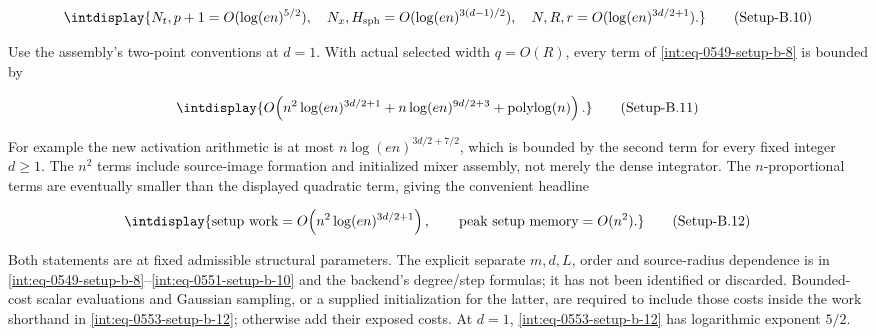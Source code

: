 \label{int:eq-setup-b-10}
\begingroup\renewcommand{\theHequation}{intdisplay.1043}
\begin{equation}
\intdisplay{
N_t,p+1=O(\log(en)^{5/2}),\quad
N_x,H_{\rm sph}=O(\log(en)^{3(d-1)/2}),\quad
N,R,r=O(\log(en)^{3d/2+1}).
}
\tag{Setup-B.10}
\label{int:eq-0551-setup-b-10}
\end{equation}
\endgroup


Use the assembly's two-point conventions at \(d=1\). With actual selected width \(q=O(R)\), every term of \hyperref[int:eq-setup-b-8]{\eqref{int:eq-0549-setup-b-8}} is bounded by


\label{int:eq-setup-b-11}
\begingroup\renewcommand{\theHequation}{intdisplay.1044}
\begin{equation}
\intdisplay{
O\!\left(n^2\log(en)^{3d/2+1}
             +n\log(en)^{9d/2+3}+\operatorname{polylog}(n)\right).
}
\tag{Setup-B.11}
\label{int:eq-0552-setup-b-11}
\end{equation}
\endgroup


For example the new activation arithmetic is at most \(n\log(en)^{3d/2+7/2}\), which is bounded by the second term for every fixed integer \(d\ge1\). The \(n^2\) terms include source-image formation and initialized mixer assembly, not merely the dense integrator. The \(n\)-proportional terms are eventually smaller than the displayed quadratic term, giving the convenient headline


\label{int:eq-setup-b-12}
\begingroup\renewcommand{\theHequation}{intdisplay.1045}
\begin{equation}
\intdisplay{
\text{setup work}=O\!\left(n^2\log(en)^{3d/2+1}\right),\qquad
\text{peak setup memory}=O(n^2).
}
\tag{Setup-B.12}
\label{int:eq-0553-setup-b-12}
\end{equation}
\endgroup


Both statements are at fixed admissible structural parameters. The explicit separate \(m,\allowbreak d,\allowbreak L\), order and source-radius dependence is in \hyperref[int:eq-setup-b-8]{\eqref{int:eq-0549-setup-b-8}}--\allowbreak \hyperref[int:eq-setup-b-10]{\eqref{int:eq-0551-setup-b-10}} and the backend's degree/step formulas; it has not been identified or discarded. Bounded-cost scalar evaluations and Gaussian sampling, or a supplied initialization for the latter, are required to include those costs inside the work shorthand in \hyperref[int:eq-setup-b-12]{\eqref{int:eq-0553-setup-b-12}}; otherwise add their exposed costs. At \(d=1\), \hyperref[int:eq-setup-b-12]{\eqref{int:eq-0553-setup-b-12}} has logarithmic exponent \(5/2\).


